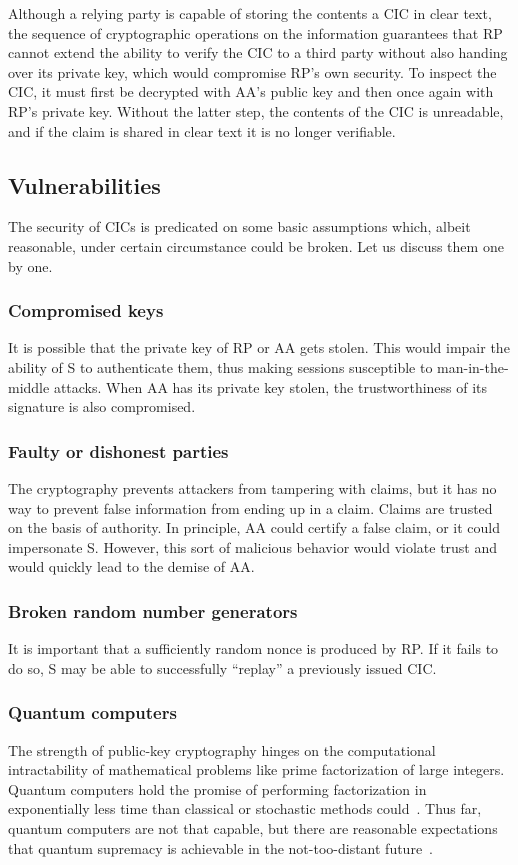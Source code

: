 \documentclass[conference]{IEEEtran}
\begin{document}
Although a relying party is capable of storing the contents a CIC in clear text, the sequence of cryptographic operations on the information guarantees that {\sf RP} cannot extend the ability to verify the CIC to a third party without also handing over its private key, which would compromise {\sf RP}'s own security. To inspect the CIC, it must first be decrypted with {\sf AA}'s public key and then once again with {\sf RP}'s private key. Without the latter step, the contents of the CIC is unreadable, and if the claim is shared in clear text it is no longer verifiable.

\subsection{Vulnerabilities}
The security of CICs is predicated on some basic assumptions which, albeit reasonable, under certain circumstance could be broken. Let us discuss them one by one.
\subsubsection{Compromised keys}
It is possible that the private key of {\sf RP} or {\sf AA} gets stolen. This would impair the ability of {\sf S} to authenticate them, thus making sessions susceptible to man-in-the-middle attacks. When {\sf AA} has its private key stolen, the trustworthiness of its signature is also compromised.
\subsubsection{Faulty or dishonest parties}
The cryptography prevents attackers from tampering with claims, but it has no way to prevent false information from ending up in a claim. Claims are trusted on the basis of authority. In principle, {\sf AA} could certify a false claim, or it could impersonate {\sf S}. However, this sort of malicious behavior would violate trust and would quickly lead to the demise of {\sf AA}.
\subsubsection{Broken random number generators}
It is important that a sufficiently random nonce is produced by {\sf RP}. If it fails to do so, {\sf S} may be able to successfully ``replay'' a previously issued CIC.
\subsubsection{Quantum computers}
The strength of public-key cryptography hinges on the computational intractability of mathematical problems like prime factorization of large integers. Quantum computers hold the promise of performing factorization in exponentially less time than classical or stochastic methods could~\cite{deutsch1992rapid}. Thus far, quantum computers are not that capable, but there are reasonable expectations that quantum supremacy is achievable in the not-too-distant future~\cite{boixo2016characterizing}.
\end{document}
